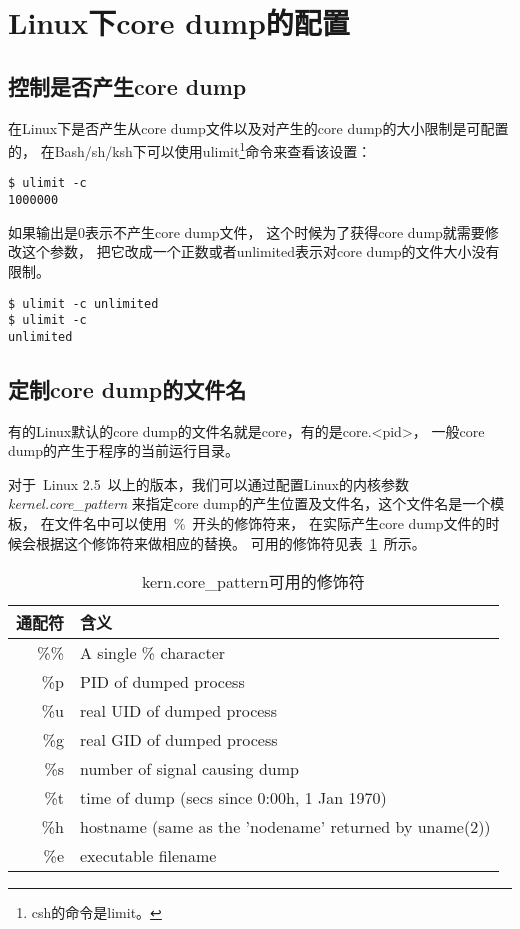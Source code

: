 \section{Linux下core dump的配置}
\subsection{控制是否产生core dump}
在Linux下是否产生从core dump文件以及对产生的core dump的大小限制是可配置的，
在Bash/sh/ksh下可以使用ulimit\footnote{csh的命令是limit。}命令来查看该设置：\\
\begin{lstlisting}
$ ulimit -c
1000000
\end{lstlisting}
如果输出是0表示不产生core dump文件，
这个时候为了获得core dump就需要修改这个参数，
把它改成一个正数或者unlimited表示对core dump的文件大小没有限制。

\begin{lstlisting}
$ ulimit -c unlimited
$ ulimit -c
unlimited
\end{lstlisting}

\subsection{定制core dump的文件名}

有的Linux默认的core dump的文件名就是core，有的是core.<pid>，
一般core dump的产生于程序的当前运行目录。

对于~Linux 2.5~以上的版本，我们可以通过配置Linux的内核参数
\emph{kernel.core\_pattern}
来指定core dump的产生位置及文件名，这个文件名是一个模板，
在文件名中可以使用~\%~开头的修饰符来，
在实际产生core dump文件的时候会根据这个修饰符来做相应的替换。
可用的修饰符见表~\ref{sec:tab_core_pattern}~所示。

\begin{table}
\begin{tabular}{r|l}
\hline
通配符 & 含义   \\
\hline
\%\%  &   A single \% character    \\
\%p  &   PID of dumped process   \\
\%u  &   real UID of dumped process  \\
\%g  &   real GID of dumped process  \\
\%s  &   number of signal causing dump   \\
\%t  &   time of dump (secs since 0:00h, 1 Jan 1970) \\
\%h  &   hostname (same as the 'nodename' returned by uname(2))  \\
\%e  &   executable filename \\
\hline
\end{tabular}
\caption{kern.core\_pattern可用的修饰符}\label{sec:tab_core_pattern}
\end{table}

